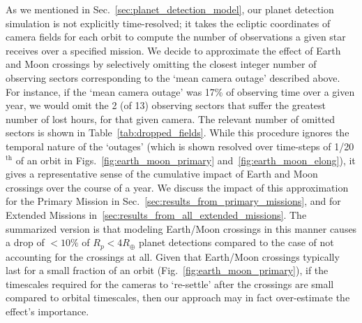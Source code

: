 As we mentioned in Sec.~\ref{sec:planet_detection_model}, our planet detection simulation is not explicitly time-resolved; it takes the ecliptic coordinates of camera fields for each orbit to compute the number of observations a given star receives over a specified mission.
We decide to approximate the effect of Earth and Moon crossings by selectively omitting the closest integer number of observing sectors corresponding to the `mean camera outage' described above.
For instance, if the `mean camera outage' was 17\% of \tesss observing time over a given year, we would omit the 2 (of 13) observing sectors that suffer the greatest number of lost hours, for that given camera.
The relevant number of omitted sectors is shown in Table~\ref{tab:dropped_fields}.
While this procedure ignores the temporal nature of the `outages' (which is shown resolved over time-steps of 1/20$^\mathrm{th}$ of an orbit in Figs.~\ref{fig:earth_moon_primary} and~\ref{fig:earth_moon_elong}), it gives a representative sense of the cumulative impact of Earth and Moon crossings over the course of a year.
We discuss the impact of this approximation for the Primary Mission in Sec.~\ref{sec:results_from_primary_missions}, and for Extended Missions in~\ref{sec:results_from_all_extended_missions}.
The summarized version is that modeling Earth/Moon crossings in this manner causes a drop of $<10\%$ of $R_p < 4R_\oplus$ planet detections compared to the case of not accounting for the crossings at all.
Given that Earth/Moon crossings typically last for a small fraction of an orbit (Fig.~\ref{fig:earth_moon_primary}), if the timescales required for the cameras to `re-settle' after the crossings are small compared to orbital timescales, then our approach may in fact over-estimate the effect's importance.

